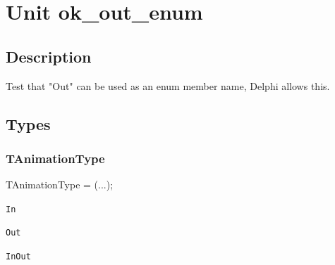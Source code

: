 \documentclass{report}
\newif\ifpdf
\begin{document}
\label{toc}\tableofcontents
\newpage
\newlength{\tmplength}
\chapter{Unit ok{\_}out{\_}enum}
\label{ok_out_enum}
\section{Description}
Test that "Out" can be used as an enum member name, Delphi allows this.
\section{Types}
\ifpdf
\subsection*{\large{\textbf{TAnimationType}}\normalsize\hspace{1ex}\hrulefill}
\else
\subsection*{TAnimationType}
\fi
\label{ok_out_enum-TAnimationType}
\begin{list}{}{
\setlength{\itemindent}{0cm}
\setlength{\listparindent}{0cm}
\setlength{\leftmargin}{\evensidemargin}
\addtolength{\leftmargin}{\tmplength}
\settowidth{\labelsep}{X}
\addtolength{\leftmargin}{\labelsep}
\setlength{\labelwidth}{\tmplength}
}
\item[\textbf{Declaration}\hfill]
\ifpdf
\begin{flushleft}
\fi
\begin{ttfamily}
TAnimationType = (...);\end{ttfamily}

\ifpdf
\end{flushleft}
\fi

\par
\item[\textbf{Description}]
 \item[\textbf{Values}]
\begin{description}
\item[\texttt{In}] \label{ok_out_enum-In}
\index{}
 
\item[\texttt{Out}] \label{ok_out_enum-Out}
\index{}
 
\item[\texttt{InOut}] \label{ok_out_enum-InOut}
\index{}
 
\end{description}


\end{list}
\ifpdf
\end{document}
